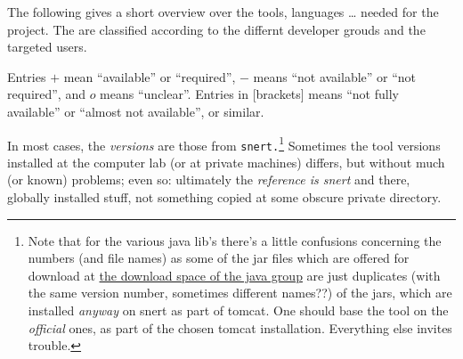 The following gives a short overview over the tools, languages \ldots
needed for the project. The are classified according to the differnt
developer grouds and the targeted users.

Entries $+$ mean ``available'' or ``required'', $-$ means ``not available''
or ``not required'', and $o$ means ``unclear''. Entries in [brackets] means
``not fully available'' or ``almost not available'', or similar.

In most cases, the \emph{versions} are those from
\texttt{snert.}\footnote{Note that for the various java lib's there's a
  little confusions concerning the numbers (and file names) as some of the
  jar files which are offered for download at
  \href{http://snert.informatik.uni-kiel.de:8080/~wprguest3/downloads/}{the
    download space of the java group} are just duplicates (with the same
  version number, sometimes different names??) of the jars, which are
  installed \emph{anyway} on snert as part of tomcat. One should base the
  tool on the \emph{official} ones, as part of the chosen tomcat
  installation. Everything else invites trouble.} Sometimes the tool
versions installed at the computer lab (or at private machines) differs,
but without much (or known) problems; even so: ultimately the
\emph{reference is snert} and there, globally installed stuff, not
something copied at some obscure private directory.



